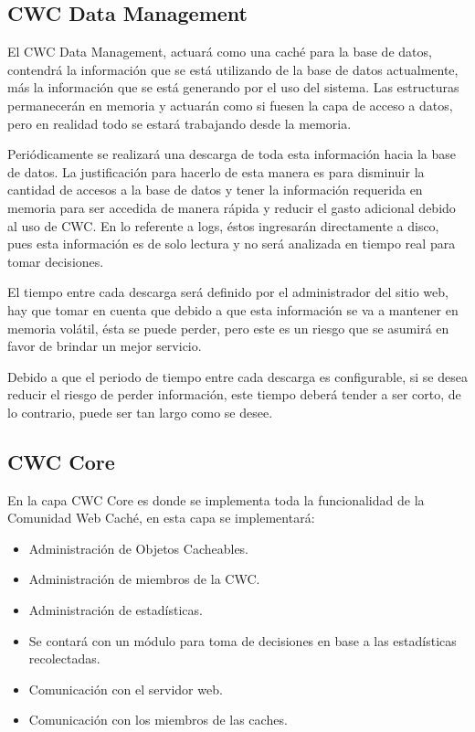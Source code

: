 
\subsection{CWC Data Management}

El CWC Data Management, actuará como una caché para la base de datos, contendrá la información que se está utilizando  de la base de datos actualmente, más la información que se está generando por el uso del sistema. Las estructuras permanecerán en memoria y actuarán como si fuesen la capa de acceso a datos, pero en realidad todo se estará trabajando desde la  memoria. 

Periódicamente se realizará una descarga de toda esta información hacia la base de datos. La justificación para hacerlo de esta manera es para disminuir la cantidad de accesos a la base de datos y tener la información requerida en memoria para ser accedida de manera rápida y reducir el gasto adicional debido al uso de CWC. En lo referente a logs, éstos ingresarán directamente a disco, pues esta información es de solo lectura y no será analizada en tiempo real para tomar decisiones. 

El tiempo entre cada descarga será definido por el administrador del sitio web, hay que tomar en cuenta que debido a que esta información se va a mantener en memoria volátil, ésta se puede perder, pero este es un riesgo que se asumirá en favor de brindar un mejor servicio. 

Debido a que el periodo de tiempo entre cada descarga es configurable, si se desea reducir el riesgo de perder información, este tiempo deberá tender a ser corto, de lo contrario, puede ser tan largo como se desee. 



\subsection{CWC Core}

En la capa CWC Core es donde se implementa toda la funcionalidad de la Comunidad Web Caché, en esta capa se implementará:

\begin{itemize}
\item Administración de Objetos Cacheables.
\item Administración de miembros de la CWC.
\item Administración de estadísticas.
\item Se contará con un módulo para toma de decisiones en base a las estadísticas recolectadas.
\item Comunicación con el servidor web.
\item Comunicación con los miembros de las caches.
\end{itemize}


